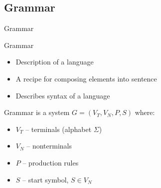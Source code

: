 \documentclass{beamer}
\begin{document}
\subsection{Grammar}

\begin{frame}{Grammar}

\begin{block}{Grammar}
\begin{itemize}
\item Description of a language
\item A recipe for composing elements into sentence
\item Describes syntax of a language
\end{itemize}
\end{block}

\begin{definition}{Grammar}
is a system $G = (V_T, V_N, P, S)$ where:
\begin{itemize}
\item $V_T$ -- terminals (alphabet $\Sigma$)
\item $V_N$ -- nonterminals
\item $P$ -- production rules
\item $S$ -- start symbol, $S\in V_N$
\end{itemize}
\end{definition}

\end{frame}
\end{document}

